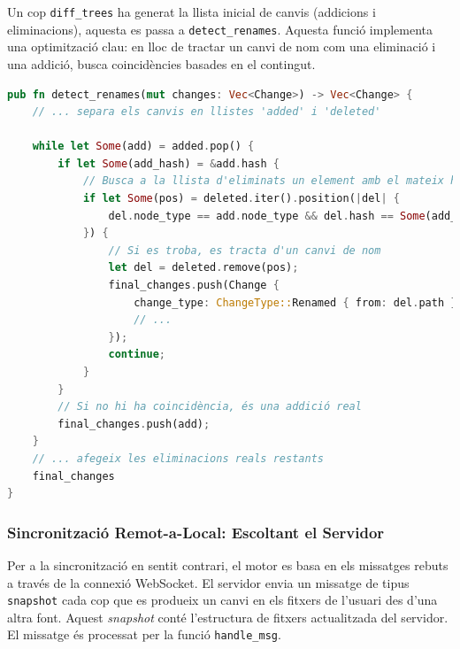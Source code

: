 Un cop \texttt{diff\_trees} ha generat la llista inicial de canvis (addicions i eliminacions), aquesta es passa a \texttt{detect\_renames}. Aquesta funció implementa una optimització clau: en lloc de tractar un canvi de nom com una eliminació i una addició, busca coincidències basades en el contingut.

\begin{lstlisting}[language=Rust, caption={Fragment clau de \texttt{detect\_renames} a \texttt{fstree.rs}}]
pub fn detect_renames(mut changes: Vec<Change>) -> Vec<Change> {
    // ... separa els canvis en llistes 'added' i 'deleted'
    
    while let Some(add) = added.pop() {
        if let Some(add_hash) = &add.hash {
            // Busca a la llista d'eliminats un element amb el mateix hash
            if let Some(pos) = deleted.iter().position(|del| {
                del.node_type == add.node_type && del.hash == Some(add_hash.clone())
            }) {
                // Si es troba, es tracta d'un canvi de nom
                let del = deleted.remove(pos);
                final_changes.push(Change {
                    change_type: ChangeType::Renamed { from: del.path },
                    // ...
                });
                continue;
            }
        }
        // Si no hi ha coincidència, és una addició real
        final_changes.push(add);
    }
    // ... afegeix les eliminacions reals restants
    final_changes
}
\end{lstlisting}

\subsubsection{Sincronització Remot-a-Local: Escoltant el Servidor}
Per a la sincronització en sentit contrari, el motor es basa en els missatges rebuts a través de la connexió WebSocket. El servidor envia un missatge de tipus \texttt{snapshot} cada cop que es produeix un canvi en els fitxers de l'usuari des d'una altra font. Aquest \textit{snapshot} conté l'estructura de fitxers actualitzada del servidor. El missatge és processat per la funció \texttt{handle\_msg}.


